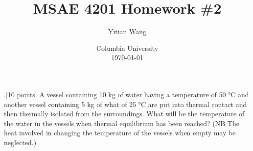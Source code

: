 \documentclass{article}
\title{MSAE 4201 Homework \#2}
\author{Yitian Wang}
\date{Columbia University \\ \today}
\begin{document}
.[10 points] A vessel containing 10 kg of water having a 
temperature of 50 °C and another vessel containing 5 kg of what of 25 °C 
are put into thermal contact and then thermally isolated from the surroundings. 
What will be the temperature of the water in the vessels when  thermal  equilibrium  has  been  reached?  
(NB  The  heat  involved  in  changing  the  temperature of the vessels when empty may be neglected.)
\end{document}
